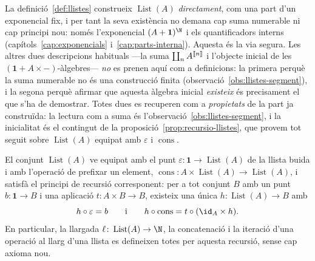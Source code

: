\begin{observacio}\label{obs:existencia-llistes}
La definició~\ref{def:llistes} construeix \(\operatorname{List}(A)\)
\emph{directament}, com una part d'un exponencial fix, i per tant la seva
existència no demana cap suma numerable ni cap principi nou: només
l'exponencial \((A+\mathbf1)^{\N}\) i els quantificadors interns
(capítols~\ref{cap:exponencials} i~\ref{cap:parts-interna}). Aquesta és la
via segura. Les altres dues descripcions habituals ---la suma
\(\coprod_{n}A^{\llbracket n\rrbracket}\) i l'objecte inicial de les
\((\mathbf1+A\times{-})\)-àlgebres--- \emph{no} es prenen aquí com a
definicions: la primera perquè la suma numerable no és una construcció
finita (observació~\ref{obs:llistes-segment}), i la segona perquè afirmar
que aquesta àlgebra inicial \emph{existeix} és precisament el que s'ha de
demostrar. Totes dues es recuperen com a \emph{propietats} de la part ja
construïda: la lectura com a suma és l'observació~\ref{obs:llistes-segment},
i la inicialitat és el contingut de la
proposició~\ref{prop:recursio-llistes}, que provem tot seguit sobre
\(\operatorname{List}(A)\) equipat amb \(\varepsilon\) i \(\operatorname{cons}\).
\end{observacio}

\begin{proposicio}\label{prop:recursio-llistes}
El conjunt \(\operatorname{List}(A)\) ve equipat amb el punt
\(\varepsilon\colon\mathbf1\to\operatorname{List}(A)\) de la llista buida i
amb l'operació de prefixar un element,
\(\operatorname{cons}\colon A\times\operatorname{List}(A)\to
\operatorname{List}(A)\), i satisfà el principi de recursió corresponent:
per a tot conjunt \(B\) amb un punt \(b\colon\mathbf1\to B\) i una aplicació
\(t\colon A\times B\to B\), existeix una única
\(h\colon\operatorname{List}(A)\to B\) amb
\[
h\circ\varepsilon=b
\qquad\text{i}\qquad
h\circ\operatorname{cons}=t\circ(\id_A\times h).
\]
En particular, la llargada
\(\ell\colon\operatorname{List}(A)\to\N\), la concatenació i la iteració
d'una operació al llarg d'una llista es defineixen totes per aquesta
recursió, sense cap axioma nou.
\end{proposicio}

